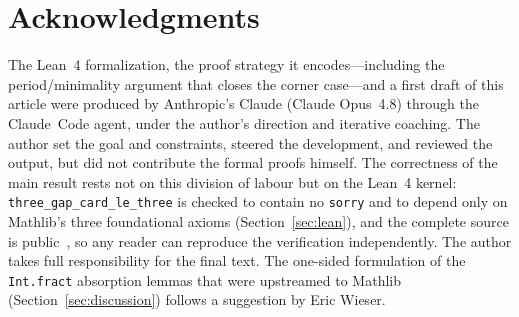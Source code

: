 \documentclass[11pt,reqno]{amsart}
\theoremstyle{plain}
\theoremstyle{definition}
\theoremstyle{remark}
\newcommand{\code}[1]{\texttt{#1}}
\begin{document}
\section*{Acknowledgments}

The Lean~4 formalization, the proof strategy it encodes---including the
period/minimality argument that closes the corner case---and a first draft of
this article were produced by Anthropic's Claude (Claude Opus~4.8) through the
Claude~Code agent, under the author's direction and iterative coaching.  The
author set the goal and constraints, steered the development, and reviewed the
output, but did not contribute the formal proofs himself.  The correctness of
the main result rests not on this division of labour but on the Lean~4 kernel:
\code{three\_gap\_card\_le\_three} is checked to contain no \code{sorry} and to
depend only on Mathlib's three foundational axioms (Section~\ref{sec:lean}), and
the complete source is public~\cite{KunertThreeGap2026}, so any reader can reproduce the
verification independently.  The author takes full responsibility for the final
text.  The one-sided formulation of the \code{Int.fract} absorption lemmas that
were upstreamed to Mathlib (Section~\ref{sec:discussion}) follows a suggestion
by Eric Wieser.
\end{document}
